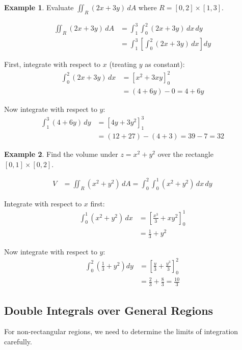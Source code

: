 \documentclass[12pt,a4paper]{book}
\theoremstyle{definition}
\newtheorem{example}{Example}[chapter]
\begin{document}
\begin{example}
Evaluate $\iint_R (2x + 3y) \, dA$ where $R = [0,2] \times [1,3]$.

\begin{align}
\iint_R (2x + 3y) \, dA &= \int_1^3 \int_0^2 (2x + 3y) \, dx \, dy\\
&= \int_1^3 \left[ \int_0^2 (2x + 3y) \, dx \right] dy
\end{align}

First, integrate with respect to $x$ (treating $y$ as constant):
\begin{align}
\int_0^2 (2x + 3y) \, dx &= \left[ x^2 + 3xy \right]_0^2\\
&= (4 + 6y) - 0 = 4 + 6y
\end{align}

Now integrate with respect to $y$:
\begin{align}
\int_1^3 (4 + 6y) \, dy &= \left[ 4y + 3y^2 \right]_1^3\\
&= (12 + 27) - (4 + 3) = 39 - 7 = 32
\end{align}
\end{example}

\begin{example}
Find the volume under $z = x^2 + y^2$ over the rectangle $[0,1] \times [0,2]$.

\begin{align}
V &= \iint_R (x^2 + y^2) \, dA = \int_0^2 \int_0^1 (x^2 + y^2) \, dx \, dy
\end{align}

Integrate with respect to $x$ first:
\begin{align}
\int_0^1 (x^2 + y^2) \, dx &= \left[ \frac{x^3}{3} + xy^2 \right]_0^1\\
&= \frac{1}{3} + y^2
\end{align}

Now integrate with respect to $y$:
\begin{align}
\int_0^2 \left( \frac{1}{3} + y^2 \right) dy &= \left[ \frac{y}{3} + \frac{y^3}{3} \right]_0^2\\
&= \frac{2}{3} + \frac{8}{3} = \frac{10}{3}
\end{align}
\end{example}

\subsection{Double Integrals over General Regions}

For non-rectangular regions, we need to determine the limits of integration carefully.
\end{document}
